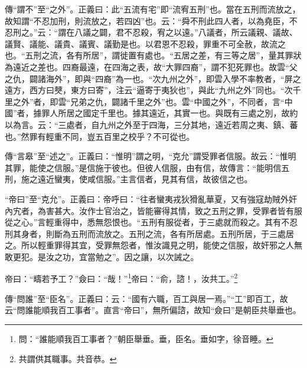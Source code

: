 {\noindent\zhuan{}\fzbyks 傳“謂不”至“之外”。正義曰：此“五流有宅”即“流宥五刑”也。當在五刑而流放之，故知謂“不忍加刑，則流放之，若四凶”也。云：“舜不刑此四人者，以為堯臣，不忍刑之。”云：“謂在八議之闢，君不忍殺，宥之以遠。”八議者，所云議親、議故、議賢、議能、議貴、議賓、議勤是也。以君恩不忍殺，罪重不可全赦，故流之也。“五刑之流，各有所居”，謂徙置有處也。“五居之差，有三等之居”，量其罪狀為遠近之差也。四裔最遠，在四海之表，故“大罪四裔”，謂不犯死罪也。故雲“父之仇，闢諸海外”，即與“四裔”為一也。“次九州之外”，即雲入學不率教者，“屏之遠方，西方曰僰，東方曰寄”，注云“逼寄于夷狄也”，與此“九州之外”同也。“次千里之外”者，即雲“兄弟之仇，闢諸千里之外”也。雲“中國之外”，不同者，言“中國”者，據罪人所居之國定千里也。據其遠近，其實一也。與既有三處之別，故約以為言。云：“三處者，自九州之外至于四海，三分其地，遠近若周之夷、鎮、蕃也。”然罪有輕重不同，豈五百里之校乎？不可從也。 \par}

{\noindent\zhuan{}\fzbyks 傳“言皋”至“述之”。正義曰：“惟明”謂之明，“克允”謂受罪者信服。故云：“惟明其罪，能使之信服。”是信施于彼也。但彼人信服，由有信，故傳言：“能明信五刑，施之遠近蠻夷，使咸信服。”主言信者，見其有信，故彼信之也。 \par}

{\noindent\shu{}\fzkt “帝曰”至“克允”。正義曰：帝呼曰：“往者蠻夷戎狄猾亂華夏，又有強寇劫賊外奸內宄者，為害甚大。汝作士官治之，皆能審得其情，致之五刑之罪，受罪者皆有服從之心。”言輕重得中，悉無怨恨也。“五刑有服從者，于三處就而殺之。其有不忍刑其身者，則斷為五刑而流放之。五刑之流，各有所居處。五刑所居，于三處居之。所以輕重罪得其宜，受罪無怨者，惟汝識見之明，能使之信服，故奸邪之人無敢更犯。是汝之功，宜當勉之”。因之讓，以次誡之。 \par}

帝曰：“疇若予工？”僉曰：“哉！”\footnote{問：“誰能順我百工事者？”朝臣舉垂。垂，臣名。垂如字，徐音睡。}帝曰：“俞，諮！，汝共工。”\footnote{共謂供其職事。共音恭。}

{\noindent\zhuan{}\fzbyks 傳“問誰”至“臣名”。正義曰：云：“國有六職，百工與居一焉。”“工”即百工，故云“問誰能順我百工事者”。直言“帝曰”，無所偏諮，故知“僉曰”是朝臣共舉垂也。 \par}

